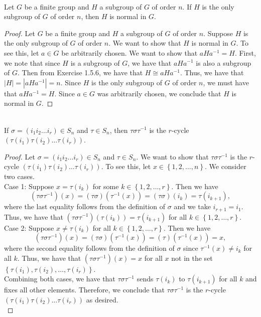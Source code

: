 \documentclass{article}
\begin{document}
\begin{problem}[Exercise 1.5.7] \\
    Let $G$ be a finite group and $H$ a subgroup of $G$ of order $n$. If $H$ is the only subgroup of $G$ of order $n$, then $H$ is normal in $G$.
\end{problem}

\begin{proof}
    Let $G$ be a finite group and $H$ a subgroup of $G$ of order $n$. Suppose $H$ is the only subgroup of $G$ of order $n$. We want to show that $H$ is normal in $G$. To see this, let $a \in G$ be arbitrarily chosen. We want to show that $aHa^{-1} = H$. First, we note that since $H$ is a subgroup of $G$, we have that $aHa^{-1}$ is also a subgroup of $G$. Then from Exercise 1.5.6, we have that $H \cong aHa^{-1}$. Thus, we have that $|H| = |aHa^{-1}| = n$. Since $H$ is the only subgroup of $G$ of order $n$, we must have that $aHa^{-1} = H$. Since $a \in G$ was arbitrarily chosen, we conclude that $H$ is normal in $G$.
\end{proof}



\begin{problem}[Exercise 1.6.3] \\
    If $\sigma = \left( i_1i_2\dots i_r \right) \in S_n$ and $\tau \in S_n$, then $\tau \sigma \tau^{-1}$ is the $r$-cycle $(\tau(i_1)\tau(i_2)\dots\tau(i_r))$.
\end{problem}

\begin{proof}
    Let $\sigma = (i_1 i_2 \dots i_r) \in S_n$ and $\tau \in S_n$. We want to show that $\tau \sigma \tau^{-1}$ is the $r$-cycle $(\tau(i_1) \tau(i_2) \dots \tau(i_r))$. To see this, let $x \in \left\{ 1,2,\dots,n \right\}$. We consider two cases. \\
    Case 1: Suppose $x = \tau(i_k)$ for some $k \in \left\{ 1,2,\dots,r \right\}$. Then we have
    \[
        (\tau \sigma \tau^{-1})(x) = (\tau \sigma)(\tau^{-1}(x)) = (\tau \sigma)(i_k) = \tau(i_{k+1}),
    \]
    where the last equality follows from the definition of $\sigma$ and we take $i_{r+1} = i_1$. Thus, we have that $(\tau \sigma \tau^{-1})(\tau(i_k)) = \tau(i_{k+1})$ for all $k \in \left\{ 1,2,\dots,r \right\}$. \\
    Case 2: Suppose $x \neq \tau(i_k)$ for all $k \in \left\{ 1,2,\dots,r \right\}$. Then we have
    \[
        (\tau \sigma \tau^{-1})(x) = (\tau \sigma)(\tau^{-1}(x)) = (\tau)(\tau^{-1}(x)) = x,
    \]
    where the second equality follows from the definition of $\sigma$ since $\tau^{-1}(x) \neq i_k$ for all $k$. Thus, we have that $(\tau \sigma \tau^{-1})(x) = x$ for all $x$ not in the set $\left\{ \tau(i_1),\tau(i_2),\dots,\tau(i_r) \right\}$.\\
    Combining both cases, we have that $\tau\sigma\tau^{-1}$ sends $\tau(i_k)$ to $\tau(i_{k+1})$ for all $k$ and fixes all other elements. Therefore, we conclude that $\tau \sigma \tau^{-1}$ is the $r$-cycle $(\tau(i_1) \tau(i_2) \dots \tau(i_r))$ as desired. \\
\end{proof}
\end{document}
